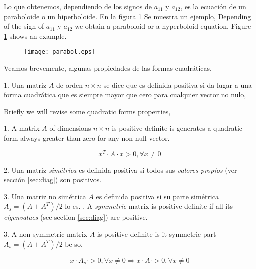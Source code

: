 \begin{paracol}{2}
Lo que obtenemos, dependiendo de los signos de $a_{11}$ y $a_{12}$, es la ecuación de un paraboloide o un hiperboloide. En la figura \ref{fig:parabol} Se muestra un ejemplo,
\switchcolumn
Depending of the sign of $a_{11}$ y $a_{12}$ we obtain  a paraboloid or a hyperboloid  equation. Figure \ref{fig:parabol} shows an example.
\end{paracol}
\begin{figure}[h]
\centering
\texttt{[image: parabol.eps]}
\label{fig:parabol}
\end{figure}
\begin{paracol}{2}
Veamos brevemente, algunas propiedades de las formas cuadráticas,

1. Una matriz $A$ de orden $ n\times n$ se dice que es definida positiva si da lugar a una forma cuadrática que es siempre mayor que cero para cualquier vector no nulo,

\switchcolumn
Briefly we will revise some quadratic forms properties, 

1. A matrix $A$ of dimensions $n\times n$ is positive definite is generates a quadratic form always greater than zero for any non-null vector.
\end{paracol}
\begin{equation*}
x^T \cdot A \cdot x > 0, \forall x \neq 0 
\end{equation*}
\begin{paracol}{2}
2. Una matriz \emph{simétrica} es definida positiva si todos sus \emph{valores propios} (ver sección \ref{sec:diag}) son positivos.

3. Una matriz no simétrica $A$ es definida positiva si su parte simétrica $A_s=(A+A^T)/2$ lo es.
. A \emph{symmetric} matrix is positive definite if all its \emph{eigenvalues} (see section \ref{sec:diag}) are positive. 

3. A non-symmetric matrix $A$ is positive definite is it symmetric part $A_s=(A+A^T)/2$ be so. 
\end{paracol}
\begin{equation*}
x\cdot A_s\cdot >0, \forall x \neq 0 \Rightarrow x\cdot A\cdot >0, \forall x \neq 0
\end{equation*}

